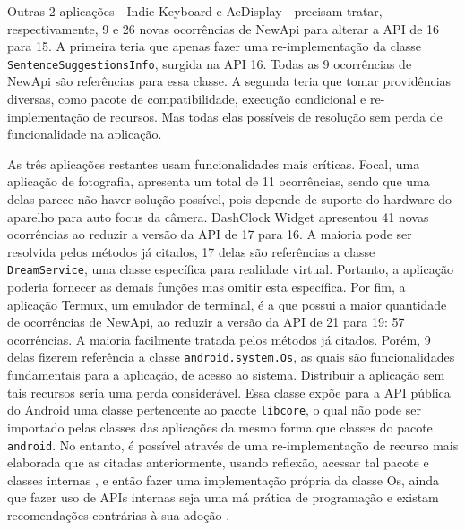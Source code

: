Outras 2 aplicações - Indic Keyboard e AcDisplay - precisam tratar, respectivamente,
9 e 26 novas ocorrências de NewApi para alterar a API de 16 para 15. A primeira teria
que apenas fazer uma re-implementação da classe \texttt{SentenceSuggestionsInfo},
surgida na API 16. Todas as 9 ocorrências de NewApi são referências para essa classe.
A segunda teria que tomar providências diversas, como pacote de compatibilidade, execução
condicional e re-implementação de recursos. Mas todas elas possíveis de resolução sem perda
de funcionalidade na aplicação.

As três aplicações restantes usam funcionalidades mais críticas. Focal, uma
aplicação de fotografia, apresenta um total de 11 ocorrências, sendo que uma
delas parece não haver solução possível, pois depende de suporte do hardware
do aparelho para auto focus da câmera. DashClock Widget apresentou 41 novas
ocorrências ao reduzir a versão da API de 17 para 16. A maioria pode ser
resolvida pelos métodos já citados, 17 delas são referências a classe
\texttt{DreamService}, uma classe específica para realidade virtual.
Portanto, a aplicação poderia fornecer as demais funções mas omitir esta
específica. Por fim, a aplicação Termux, um emulador de terminal, é a que
possui a maior quantidade de ocorrências de NewApi, ao reduzir a versão da
API de 21 para 19: 57 ocorrências. A maioria facilmente tratada pelos métodos
já citados. Porém, 9 delas fizerem referência a classe \texttt{android.system.Os},
as quais são funcionalidades fundamentais para a aplicação, de acesso ao sistema.
Distribuir a aplicação sem tais recursos seria uma perda considerável. Essa classe
expõe para a API pública do Android uma classe pertencente ao pacote \texttt{libcore},
o qual não pode ser importado pelas classes das aplicações da mesmo forma que classes
do pacote \texttt{android}. No entanto, é possível através de uma re-implementação de
recurso mais elaborada que as citadas anteriormente, usando reflexão, acessar tal pacote
e classes internas \cite{Libcore}, e então fazer uma implementação própria da classe Os,
ainda que fazer uso de APIs internas seja uma má prática de programação e existam
recomendações contrárias à sua adoção \cite{Businge2015} \cite{Mastrangelo2015}.

